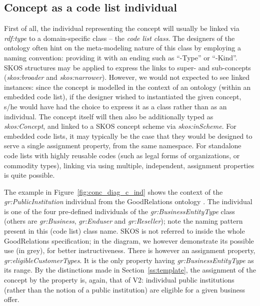 \subsection{Concept as a code list individual}


First of all, the individual representing the concept will usually be linked via \emph{rdf:type} to a domain-specific class -- the \emph{code list class}.
The designers of the ontology often hint on the meta-modeling nature of this class by employing a naming convention: providing it with an ending such as ``-Type'' or ``-Kind''.
SKOS structures may be applied to express the links to super- and sub-concepts (\emph{skos:broader} and  \emph{skos:narrower}).
However, we would not expected to see linked instances: since the concept is modelled in the context of an ontology (within an embedded code list), if the designer wished to instantiated the given concept, s/he would have had the choice to express it as a class rather than as an individual.
The concept itself will then also be additionally typed as \emph{skos:Concept}, and linked to a SKOS concept scheme via \emph{skos:inScheme}.
For embedded code lists, it may typically be the case that they would be designed to serve a single assignment property, from the same namespace.
For standalone code lists with highly reusable codes (such as legal forms of organizations, or commodity types), linking via using multiple, independent, assignment properties is quite possible.

The example in Figure~\ref{fig:conc_diag_c_ind} shows the context of the \emph{gr:PublicInstitution} individual from the GoodRelations ontology \cite{GR}.
The individual is one of the four pre-defined individuals of the \emph{gr:BusinessEntityType} class (others are \emph{gr:Business}, \emph{gr:Enduser} and \emph{gr:Reseller}); note the naming pattern present in this (code list) class name.
SKOS is not referred to inside the whole GoodRelations specification; in the diagram, we however demonstrate its possible use (in grey), for better instructiveness.
There is however an assignment property, \emph{gr:eligibleCustomerTypes}.
It is the only property having \emph{gr:BusinessEntityType} as its range.
By the distinctions made in Section~\ref{ss:template}, the assignment of the concept by the property is, again, that of V2: individual public institutions (rather than the notion of a public institution) are eligible for a given business offer.


